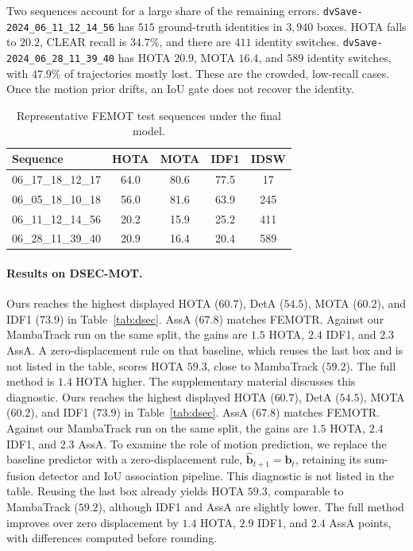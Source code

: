 \documentclass[10pt,twocolumn,letterpaper]{article}
\begin{document}
Two sequences account for a large share of the remaining errors. \texttt{dvSave-2024\_06\_11\_12\_14\_56} has $515$ ground-truth identities in $3{,}940$ boxes. HOTA falls to $20.2$, CLEAR recall is $34.7\%$, and there are $411$ identity switches. \texttt{dvSave-2024\_06\_28\_11\_39\_40} has HOTA $20.9$, MOTA $16.4$, and $589$ identity switches, with $47.9\%$ of trajectories mostly lost. These are the crowded, low-recall cases. Once the motion prior drifts, an IoU gate does not recover the identity.

\begin{table}
  \centering
  \small
  \setlength{\tabcolsep}{3.0pt}
  \caption{Representative FEMOT test sequences under the final model.}
  \label{tab:seq}
  \begin{tabular}{lcccc}
    \toprule
    Sequence & HOTA & MOTA & IDF1 & IDSW \\
    \midrule
    06\_17\_18\_12\_17 & 64.0 & 80.6 & 77.5 & 17 \\
    06\_05\_18\_10\_18 & 56.0 & 81.6 & 63.9 & 245 \\
    06\_11\_12\_14\_56 & 20.2 & 15.9 & 25.2 & 411 \\
    06\_28\_11\_39\_40 & 20.9 & 16.4 & 20.4 & 589 \\
    \bottomrule
  \end{tabular}
\end{table}

\paragraph{Results on DSEC-MOT.}
Ours reaches the highest displayed HOTA ($60.7$), DetA ($54.5$), MOTA ($60.2$), and IDF1 ($73.9$) in Table~\ref{tab:dsec}. AssA ($67.8$) matches FEMOTR. Against our MambaTrack run on the same split, the gains are $1.5$ HOTA, $2.4$ IDF1, and $2.3$ AssA. A zero-displacement rule on that baseline, which reuses the last box and is not listed in the table, scores HOTA $59.3$, close to MambaTrack ($59.2$). The full method is $1.4$ HOTA higher. The supplementary material discusses this diagnostic.
Ours reaches the highest displayed HOTA ($60.7$), DetA ($54.5$), MOTA ($60.2$), and IDF1 ($73.9$) in Table~\ref{tab:dsec}. AssA ($67.8$) matches FEMOTR. Against our MambaTrack run on the same split, the gains are $1.5$ HOTA, $2.4$ IDF1, and $2.3$ AssA. To examine the role of motion prediction, we replace the baseline predictor with a zero-displacement rule, $\hat{\mathbf b}_{t+1}=\mathbf b_t$, retaining its sum-fusion detector and IoU association pipeline. This diagnostic is not listed in the table. Reusing the last box already yields HOTA $59.3$, comparable to MambaTrack ($59.2$), although IDF1 and AssA are slightly lower. The full method improves over zero displacement by $1.4$ HOTA, $2.9$ IDF1, and $2.4$ AssA points, with differences computed before rounding.
\end{document}
